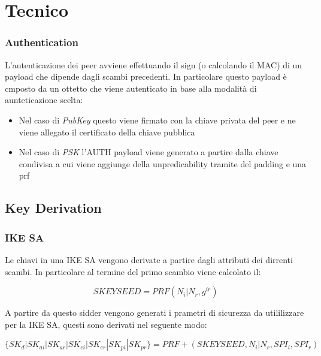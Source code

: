 
\chapter{Tecnico} %

\label{AppendixA} %


\subsection{Authentication}

L'autenticazione dei peer avviene effettuando il sign (o calcolando il MAC) di un payload che dipende dagli scambi precedenti.
In particolare questo payload è cmposto da un ottetto che viene autenticato in base alla modalità di aunteticazione scelta:

\begin{itemize}
    \item Nel caso di \textit{PubKey} questo viene firmato con la chiave privata del peer e ne viene allegato il certificato della chiave pubblica 
    \item Nel caso di \textit{PSK} l'AUTH payload viene generato a partire dalla chiave condivisa a cui viene aggiunge della unpredicability tramite del padding e una prf
\end{itemize}

\section{Key Derivation}

\subsection{IKE SA}

Le chiavi in una IKE SA vengono derivate a partire dagli attributi dei dirrenti scambi.
In particolare al termine del primo scambio viene calcolato il:

$$SKEYSEED=PRF(N_i|N_r,g^{ir})$$

A partire da questo sidder vengono generati i prametri di sicurezza da utililizzare per la IKE SA, questi sono derivati nel seguente modo:

$$\{SK_{d} | SK_{ai} | SK_{ar} | SK_{ei} | SK_{er} | SK_{pi} | SK_{pr} \} = PRF+(SKEYSEED, N_i|N_r, SPI_i, SPI_r)$$

